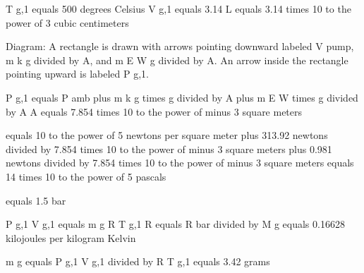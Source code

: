 T g,1 equals 500 degrees Celsius  
V g,1 equals 3.14 L  
equals 3.14 times 10 to the power of 3 cubic centimeters  

Diagram:  
A rectangle is drawn with arrows pointing downward labeled V pump, m k g divided by A, and m E W g divided by A. An arrow inside the rectangle pointing upward is labeled P g,1.

P g,1 equals P amb plus m k g times g divided by A plus m E W times g divided by A  
A equals 7.854 times 10 to the power of minus 3 square meters  

equals 10 to the power of 5 newtons per square meter plus 313.92 newtons divided by 7.854 times 10 to the power of minus 3 square meters plus 0.981 newtons divided by 7.854 times 10 to the power of minus 3 square meters equals 14 times 10 to the power of 5 pascals  

equals 1.5 bar  

P g,1 V g,1 equals m g R T g,1  
R equals R bar divided by M g equals 0.16628 kilojoules per kilogram Kelvin  

m g equals P g,1 V g,1 divided by R T g,1 equals 3.42 grams